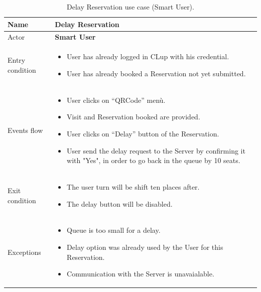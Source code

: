 \begin{table}[H]\begin{tabular}{|p{5cm} | p{7cm} | }
	\hline
	Name & \textbf{Delay Reservation} \\
	\hline
	Actor & \textbf{Smart User}\\
	\hline
	Entry condition &
	\begin{itemize}
		\item User has already logged in CLup with his credential. 
		\item User has already booked a Reservation not yet submitted.
	\end{itemize} \\
	\hline
	Events flow & 
	\begin{itemize}
		\item User clicks on “QRCode” menù.
		\item Visit and Reservation booked are provided.
		\item User clicks on “Delay” button of the Reservation.
		\item User send the delay request to the Server by confirming it with "Yes", in order to go back in the queue by 10 seats.
	\end{itemize} \\
	\hline
	Exit condition &
	\begin{itemize}
		\item The user turn will be shift ten places after.
		\item The delay button will be disabled.
	\end{itemize} \\
	\hline 
	Exceptions & 
	\begin{itemize}
		\item Queue is too small for a delay.
		\item Delay option was already used by the User for this Reservation.
    	\item Communication with the Server is unavaialable.
	\end{itemize} \\
	\hline
\end{tabular}
\caption{Delay Reservation use case (Smart User).}
\end{table}

\bigbreak

